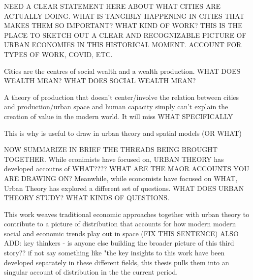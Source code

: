 NEED A CLEAR STATEMENT HERE ABOUT WHAT CITIES ARE ACTUALLY DOING. 
WHAT IS TANGIBLY HAPPENING IN CITIES THAT MAKES THEM SO IMPORTANT? WHAT KIND OF WORK? 
THIS IS THE PLACE TO SKETCH OUT A CLEAR AND RECOGNIZABLE PICTURE OF URBAN ECONOMIES IN THIS HISTORICAL MOMENT. ACCOUNT FOR TYPES OF WORK, COVID, ETC. 

Cities are the centres of social wealth and a wealth production. 
WHAT DOES WEALTH MEAN? 
WHAT DOES SOCIAL WEALTH MEAN?


A theory of production that doesn't center/involve the relation between cities and production/urban space and human capacity simply can't explain the creation of value in the modern world. It will miss WHAT SPECIFICALLY 

This is why is useful to draw in urban theory and spatial models (OR WHAT)

NOW SUMMARIZE IN BRIEF THE THREADS BEING BROUGHT TOGETHER. 
While econimists have focused on, URBAN THEORY has developed accoutns of WHAT????
WHAT ARE THE MAOR ACCOUNTS YOU ARE DRAWING ON? 
Meanwhile, while economists have focused on WHAT, Urban Theory has explored a different set of questions. 
WHAT DOES URBAN THEORY STUDY? WHAT KINDS OF QUESTIONS. 

This work weaves traditional economic approaches together with urban theory to contribute to a picture of distribution that accounts for how modern modern social and economic trends play out in space (FIX THIS SENTENCE)
ALSO ADD: 
key thinkers - is anyone else building the broader picture of this third story?? if not say something like "the key insights to this work have been developed separately in these different fields, this thesis pulls them into an singular account of distribution in the the current period. 


